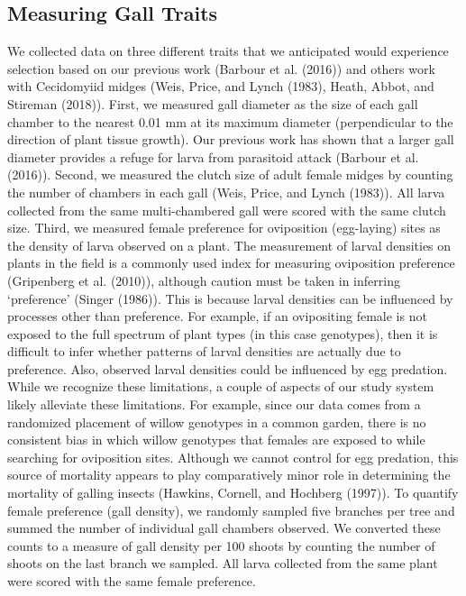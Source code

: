 \documentclass[]{elsarticle} %
\begin{document}
\subsection{Measuring Gall Traits}\label{measuring-gall-traits}

We collected data on three different traits that we anticipated would
experience selection based on our previous work (Barbour et al. (2016))
and others work with Cecidomyiid midges (Weis, Price, and Lynch (1983),
Heath, Abbot, and Stireman (2018)). First, we measured gall diameter as
the size of each gall chamber to the nearest 0.01 mm at its maximum
diameter (perpendicular to the direction of plant tissue growth). Our
previous work has shown that a larger gall diameter provides a refuge
for larva from parasitoid attack (Barbour et al. (2016)). Second, we
measured the clutch size of adult female midges by counting the number
of chambers in each gall (Weis, Price, and Lynch (1983)). All larva
collected from the same multi-chambered gall were scored with the same
clutch size. Third, we measured female preference for oviposition
(egg-laying) sites as the density of larva observed on a plant. The
measurement of larval densities on plants in the field is a commonly
used index for measuring oviposition preference (Gripenberg et al.
(2010)), although caution must be taken in inferring `preference'
(Singer (1986)). This is because larval densities can be influenced by
processes other than preference. For example, if an ovipositing female
is not exposed to the full spectrum of plant types (in this case
genotypes), then it is difficult to infer whether patterns of larval
densities are actually due to preference. Also, observed larval
densities could be influenced by egg predation.\\
While we recognize these limitations, a couple of aspects of our study
system likely alleviate these limitations. For example, since our data
comes from a randomized placement of willow genotypes in a common
garden, there is no consistent bias in which willow genotypes that
females are exposed to while searching for oviposition sites. Although
we cannot control for egg predation, this source of mortality appears to
play comparatively minor role in determining the mortality of galling
insects (Hawkins, Cornell, and Hochberg (1997)). To quantify female
preference (gall density), we randomly sampled five branches per tree
and summed the number of individual gall chambers observed. We converted
these counts to a measure of gall density per 100 shoots by counting the
number of shoots on the last branch we sampled. All larva collected from
the same plant were scored with the same female preference.
\end{document}
